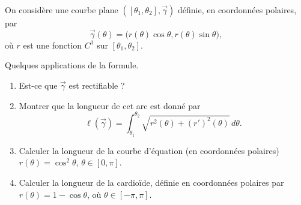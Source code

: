 \begin{exercice}\label{exoCourbesSurfaces0007}

On considère une courbe plane $([\theta_1, \theta _2], \vec{\gamma})$ définie, en coordonnées polaires, par 
\begin{equation}
\vec{\gamma} (\theta ) = \big( r( \theta) \cos \theta, r( \theta) \sin \theta \big), 
\end{equation}
où $r$ est une fonction $C^1$ sur $[\theta_1, \theta _2]$. 

Quelques applications de la formule.

\begin{enumerate}
	\item
		Est-ce que $ \vec{\gamma}$ est rectifiable ? 
	\item
		Montrer que la longueur de cet arc est donné par
		\begin{equation}		\label{EqFormDemExotLpola}
			\ell( \vec{\gamma}) = \int_{\theta_1}^{\theta _2} \sqrt{ r^2 ( \theta ) + (r')^2 ( \theta ) }\, d \theta. 
		\end{equation}
		
	\item
		Calculer la longueur de la courbe d'équation (en coordonnées polaires) $ r( \theta ) = \cos ^2 \theta$, $ \theta \in [0, \pi]$. 

	\item
		Calculer la longueur de la cardioïde, définie en coordonnées polaires par $ r( \theta ) = 1 - \cos \theta$, où $ \theta \in [- \pi,  \pi]$.  
		
\end{enumerate}

\end{exercice}
